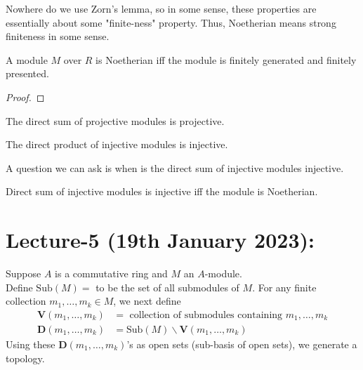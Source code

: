 \documentclass[oneside, 12pt]{scrbook}
\theoremstyle{theorem}
\begin{document}
Nowhere do we use Zorn's lemma, so in some sense, these properties are essentially about some "finite-ness" property. Thus, Noetherian means strong finiteness in some sense. 

\begin{definition}

\end{definition}

\begin{definition}

\end{definition}

\begin{theorem}
A module $M$ over $R$ is Noetherian iff the module is finitely generated and finitely presented. 
\end{theorem}

\begin{proof}

\end{proof}

\begin{proposition}
The direct sum of projective modules is projective. 
\end{proposition}

\begin{proposition}
The direct product of injective modules is injective.
\end{proposition}

A question we can ask is when is the direct sum of injective modules injective. 

\begin{proposition}
Direct sum of injective modules is injective iff the module is Noetherian.
\end{proposition}

\chapter{Lecture-5 (19th January 2023):}

Suppose $A$ is a commutative ring and $M$ an $A$-module. \\
Define $\mathrm{Sub}(M)=$ to be the set of all submodules of $M$. For any finite collection $m_{1}, \hdots , m_{k} \in M$, we next define 
\begin{align*}
\textbf{V}(m_{1}, \hdots , m_{k}) &= \text{ collection of submodules containing } m_{1}, \hdots , m_{k} \\
\textbf{D}( m_{1}, \hdots , m_{k}  ) &= \mathrm{Sub}(M) \backslash \textbf{V}(m_{1}, \hdots , m_{k}) 
\end{align*}
Using these $\textbf{D}(m_{1}, \hdots , m_{k})$'s as open sets (sub-basis of open sets), we generate a topology. 
\end{document}
